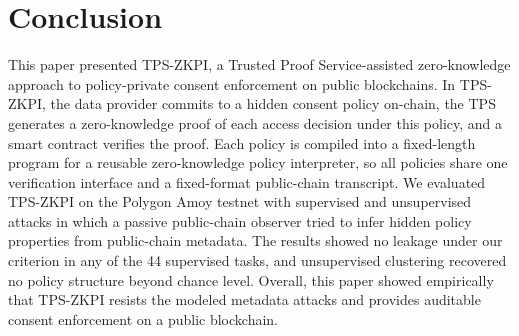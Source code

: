 \section{Conclusion}
\label{sec:conclusion}

This paper presented TPS-ZKPI, a Trusted Proof Service-assisted zero-knowledge approach to policy-private consent enforcement on public blockchains.
In TPS-ZKPI, the data provider commits to a hidden consent policy on-chain, the TPS generates a zero-knowledge proof of each access decision under this policy, and a smart contract verifies the proof.
Each policy is compiled into a fixed-length program for a reusable zero-knowledge policy interpreter, so all policies share one verification interface and a fixed-format public-chain transcript.
We evaluated TPS-ZKPI on the Polygon Amoy testnet with supervised and unsupervised attacks in which a passive public-chain observer tried to infer hidden policy properties from public-chain metadata.
The results showed no leakage under our criterion in any of the 44 supervised tasks, and unsupervised clustering recovered no policy structure beyond chance level.
Overall, this paper showed empirically that TPS-ZKPI resists the modeled metadata attacks and provides auditable consent enforcement on a public blockchain.
